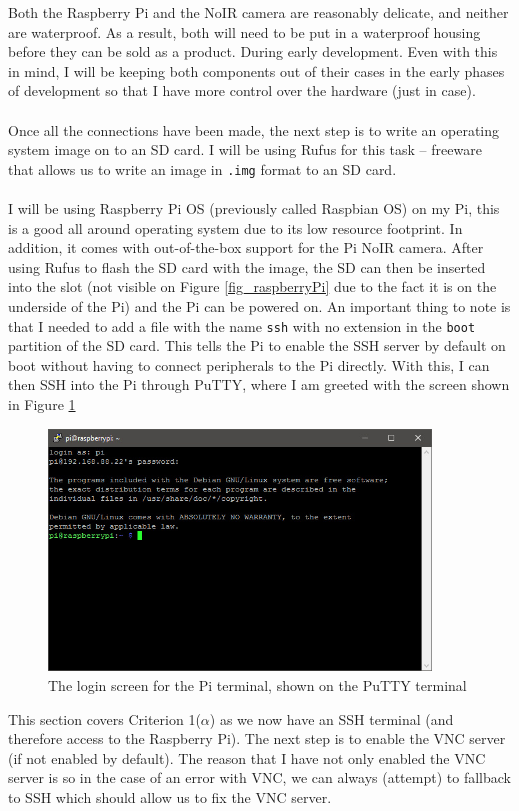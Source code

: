 \documentclass[9pt]{article}
\begin{document}
Both the Raspberry Pi and the NoIR camera are reasonably delicate, and neither are waterproof. As a result, both will need to be put in a waterproof housing before they can be sold as a product. During early development. Even with this in mind, I will be keeping both components out of their cases in the early phases of development so that I have more control over the hardware (just in case).\\\\
Once all the connections have been made, the next step is to write an operating system image on to an SD card. I will be using Rufus\cite{Rufus} for this task -- freeware that allows us to write an image in \texttt{.img} format to an SD card.\\\\
I will be using Raspberry Pi OS\cite{raspberryPi} (previously called Raspbian OS) on my Pi, this is a good all around operating system due to its low resource footprint. In addition, it comes with out-of-the-box support for the Pi NoIR camera. After using Rufus to flash the SD card with the image, the SD can then be inserted into the slot (not visible on Figure \ref{fig_raspberryPi} due to the fact it is on the underside of the Pi) and the Pi can be powered on.
An important thing to note is that I needed to add a file with the name \texttt{ssh} with no extension in the \texttt{boot} partition of the SD card. This tells the Pi to enable the SSH server by default on boot without having to connect peripherals to the Pi directly. With this, I can then SSH into the Pi through PuTTY, where I am greeted with the screen shown in Figure \ref{fig_raspberryPiBoot}
\begin{figure}[H]
	\centering
	\includegraphics[width=4in]{raspberryPiBoot.png}
	\caption{The login screen for the Pi terminal, shown on the PuTTY terminal}\label{fig_raspberryPiBoot}
\end{figure}
This section covers Criterion 1($\alpha$) as we now have an SSH terminal (and therefore access to the Raspberry Pi). The next step  is to enable the VNC server (if not enabled by default). The reason that I have not only enabled the VNC server is so in the case of an error with VNC, we can always (attempt) to fallback to SSH which should allow us to fix the VNC server. \\\\
\end{document}
